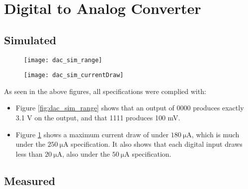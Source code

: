 \graphicspath{{content/3_results/figures}}
\section{Digital to Analog Converter}

\subsection{Simulated}

\begin{figure}[!htb]
    \centering
    \begin{minipage}{.5\textwidth}
        \centering
        \texttt{[image: dac\_sim\_range]}
        \label{fig:dac_sim_range}
    \end{minipage}
    \begin{minipage}{.45\textwidth}
        \centering
        \texttt{[image: dac\_sim\_currentDraw]}
        \label{fig:dac_sim_currentDraw}
    \end{minipage}
\end{figure}

As seen in the above figures, all specifications were complied with:
\begin{itemize}
    \item Figure \ref{fig:dac_sim_range} shows that an output of 0000 produces exactly 3.1 V on the output, and that 1111 produces 100 mV.
    \item Figure \ref{fig:dac_sim_currentDraw} shows a maximum current draw of under $\SI{180}{\micro\ampere}$, which is much under the $\SI{250}{\micro\ampere}$ specification.
          It also shows that each digital input draws less than $\SI{20}{\micro\ampere}$, also under the $\SI{50}{\micro\ampere}$ specification.
\end{itemize}

\subsection{Measured}

